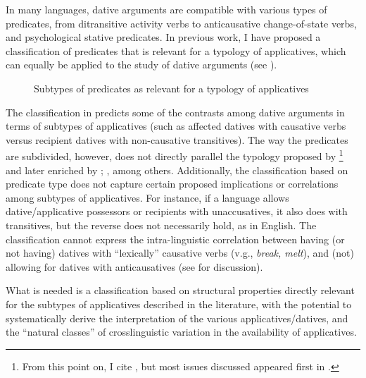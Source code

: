 \documentclass[output=paper,colorlinks,citecolor=brown,nonflat]{./langscibook}
\begin{document}
In many languages, dative arguments are compatible with various types of predicates, from ditransitive activity verbs to anticausative change-of-state verbs, and psychological stative predicates. In previous work, I have proposed a classification of predicates that is relevant for a typology of applicatives, which can equally be applied to the study of dative arguments (see ).

\begin{figure}
\caption{Subtypes of predicates as relevant for a typology of applicatives \citep[130]{Cuervo2015Chapter}}
\label{fig:cuervo:1}
\end{figure}

The classification in  predicts some of the contrasts among dative arguments in terms of subtypes of applicatives (such as affected datives with causative verbs versus recipient datives with non-causative transitives). The way the predicates are subdivided, however, does not directly parallel the typology proposed by \citep{Pylkkänen2002, Pylkkänen2008}\footnote{From this point on, I cite \citealt{Pylkkänen2008}, but most issues discussed appeared first in \citealt{Pylkkänen2002}.} and later enriched by \citealt{BonehNash2011WCCFL, Cuervo2003,Cuervo2010Probus,Kim2011high,McGinnis2001,McGinnis2008}; \citealt{McGinnisGerdts2004, RobergeTroberg2009}, among others. Additionally, the classification based on predicate type does not capture certain proposed implications or correlations among subtypes of applicatives. For instance, if a language allows dative/applicative possessors or recipients with unaccusatives, it also does with transitives, but the reverse does not necessarily hold, as in English. The classification cannot express the intra-linguistic correlation between having (or not having) datives with “lexically” causative verbs (v.g., \textit{break, melt}), and (not) allowing for datives with anticausatives (see \citealt{Peterson2007, Cuervo2015Chapter} for discussion).

What is needed is a classification based on structural properties directly relevant for the subtypes of applicatives described in the literature, with the potential to systematically derive the interpretation of the various applicatives/datives, and the “natural classes” of crosslinguistic variation in the availability of applicatives.
\end{document}
